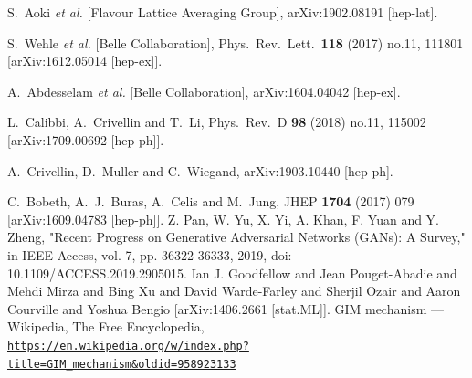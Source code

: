 \documentclass{beamer}
\begin{document}
\begin{thebibliography}{99}
	S.~Aoki {\it et al.} [Flavour Lattice Averaging Group],
	arXiv:1902.08191 [hep-lat].
	
	S.~Wehle {\it et al.} [Belle Collaboration],
	Phys.\ Rev.\ Lett.\  {\bf 118} (2017) no.11,  111801
	[arXiv:1612.05014 [hep-ex]].
	
	
	A.~Abdesselam {\it et al.} [Belle Collaboration],
	arXiv:1604.04042 [hep-ex].
	
	L.~Calibbi, A.~Crivellin and T.~Li,
	Phys.\ Rev.\ D {\bf 98} (2018) no.11,  115002
	[arXiv:1709.00692 [hep-ph]].
	
	
	A.~Crivellin, D.~Muller and C.~Wiegand,
	arXiv:1903.10440 [hep-ph].
	
	C.~Bobeth, A.~J.~Buras, A.~Celis and M.~Jung,
	JHEP {\bf 1704} (2017) 079
	[arXiv:1609.04783 [hep-ph]].
	Z. Pan, W. Yu, X. Yi, A. Khan, F. Yuan and Y. Zheng, "Recent Progress on Generative Adversarial Networks (GANs): A Survey," in IEEE Access, vol. 7, pp. 36322-36333, 2019, doi: 10.1109/ACCESS.2019.2905015.
	Ian J. Goodfellow and Jean Pouget-Abadie and Mehdi Mirza and Bing Xu and David Warde-Farley and Sherjil Ozair and Aaron Courville and Yoshua Bengio
	[arXiv:1406.2661 [stat.ML]].
	GIM mechanism --- {Wikipedia}{,} The Free Encyclopedia,
	\\\texttt{\url{https://en.wikipedia.org/w/index.php?title=GIM_mechanism&oldid=958923133}}
	


	
	
\end{thebibliography}
\end{document}
